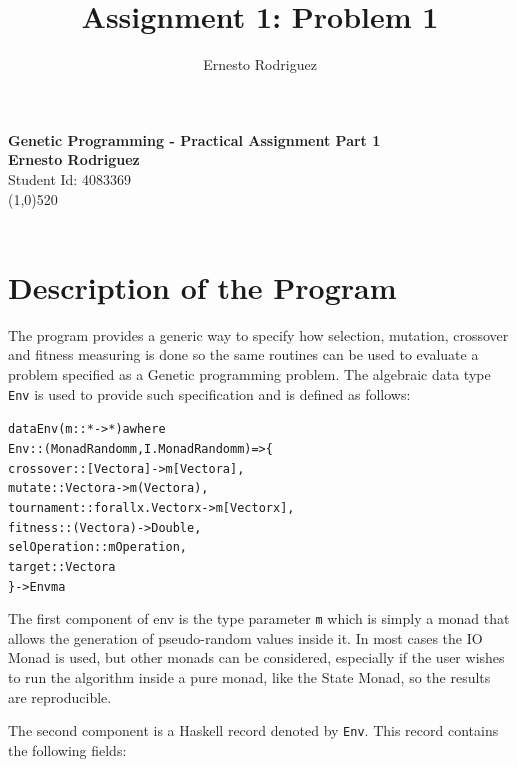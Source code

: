 \documentclass[10pt]{article}
\title{Assignment 1: Problem 1}
\author{Ernesto Rodriguez}
\begin{document}
\Huge{\bf Genetic Programming - Practical Assignment Part 1\\[1cm]}
\large{\bf Ernesto Rodriguez\\[0.5cm]}
\large{Student Id: 4083369}\\
\line(1,0){520}\\ \\

\section{Description of the Program}

The program provides a generic way to specify how selection, mutation, crossover and fitness measuring is done so the same routines can be used to evaluate a problem specified as a Genetic programming problem. The algebraic data type \verb+Env+ is used to provide such specification and is defined as follows:

\begin{alltt}

data Env (m :: * -> *) a where
  Env :: (MonadRandom m, I.MonadRandom m) => \{
    crossover :: [Vector a] -> m [Vector a],
    mutate :: Vector a -> m (Vector a),
    tournament :: forall x . Vector x -> m [Vector x],
    fitness :: (Vector a) -> Double,
    selOperation :: m Operation,
    target :: Vector a                 
  \} -> Env m a

\end{alltt}

The first component of env is the type parameter \verb+m+ which is simply a monad that allows the generation of pseudo-random values inside it. In most cases the IO Monad is used, but other monads can be considered, especially if the user wishes to run the algorithm inside a pure monad, like the State Monad, so the results are reproducible. 

The second component is a Haskell record denoted by \verb+Env+. This record contains the following fields:
\end{document}
